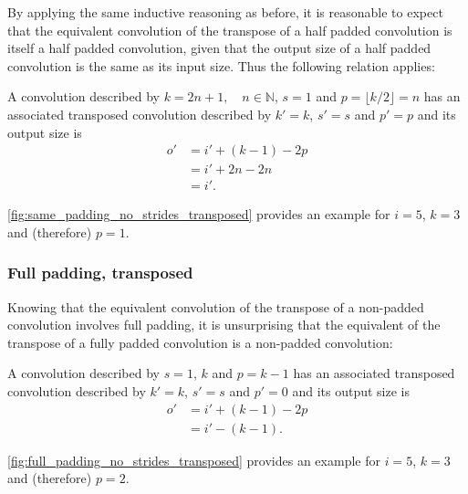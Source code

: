 By applying the same inductive reasoning as before, it is reasonable to expect
that the equivalent convolution of the transpose of a half padded convolution
is itself a half padded convolution, given that the output size of a half
padded convolution is the same as its input size. Thus the following relation
applies:

\begin{relationship}\label{rel:half_padding_no_strides_transposed}
A convolution described by $k = 2n + 1, \quad n \in \mathbb{N}$, $s = 1$ and $p
= \lfloor k / 2 \rfloor = n$ has an associated transposed convolution described
by $k' = k$, $s' = s$ and $p' = p$ and its output size is
\begin{equation*}
\begin{split}
    o' &= i' + (k - 1) - 2p \\
       &= i' + 2n - 2n \\
       &= i'.
\end{split}
\end{equation*}
\end{relationship}

\noindent\autoref{fig:same_padding_no_strides_transposed} provides an example
for $i = 5$, $k = 3$ and (therefore) $p = 1$.

\subsubsection{Full padding, transposed}

Knowing that the equivalent convolution of the transpose of a non-padded
convolution involves full padding, it is unsurprising that the equivalent of
the transpose of a fully padded convolution is a non-padded convolution:

\begin{relationship}\label{rel:full_padding_no_strides_transposed}
A convolution described by $s = 1$, $k$ and $p = k - 1$ has an
associated transposed convolution described by $k' = k$, $s' = s$ and $p' = 0$
and its output size is
\begin{equation*}
\begin{split}
    o' &= i' + (k - 1) - 2p \\
       &= i' - (k - 1).
\end{split}
\end{equation*}
\end{relationship}

\noindent\autoref{fig:full_padding_no_strides_transposed} provides an example
for $i = 5$, $k = 3$ and (therefore) $p = 2$.

